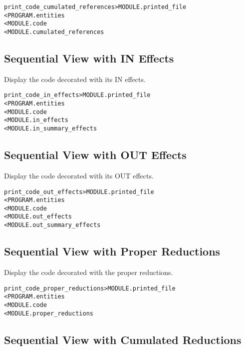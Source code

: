 \documentclass[a4paper]{report}
\newenvironment{PipsMake}{\begin{alltt}}{\end{alltt}}
\begin{document}
\begin{PipsMake}
print_code_cumulated_references    > MODULE.printed_file
        < PROGRAM.entities
        < MODULE.code
        < MODULE.cumulated_references
\end{PipsMake}


\subsection{Sequential View with IN Effects}
Display the code decorated with its IN effects.

\begin{PipsMake}
print_code_in_effects       > MODULE.printed_file
        < PROGRAM.entities
        < MODULE.code
        < MODULE.in_effects
        < MODULE.in_summary_effects
\end{PipsMake}

\subsection{Sequential View with OUT Effects}
Display the code decorated with its OUT effects.

\begin{PipsMake}
print_code_out_effects       > MODULE.printed_file
        < PROGRAM.entities
        < MODULE.code
        < MODULE.out_effects
        < MODULE.out_summary_effects
\end{PipsMake}

\subsection{Sequential View with Proper Reductions}

Display the code decorated with the proper reductions.

\begin{PipsMake}
print_code_proper_reductions > MODULE.printed_file
  < PROGRAM.entities
  < MODULE.code
  < MODULE.proper_reductions
\end{PipsMake}

\subsection{Sequential View with Cumulated Reductions}
\end{document}
